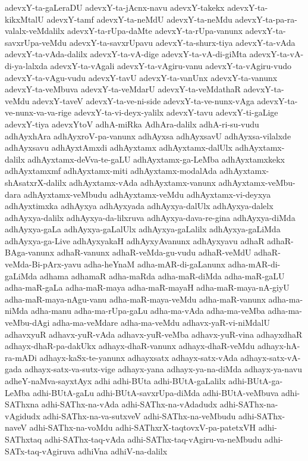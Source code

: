 {adevxY-ta-gaLeraDU
adevxY-ta-jAcnx-navu
adevxY-takekx
adevxY-ta-kikxMtalU
adevxY-tamf
adevxY-ta-neMdU
adevxY-ta-neMdu
adevxY-ta-pa-ra-valalx-veMdalilx
adevxY-ta-rUpa-daMte
adevxY-ta-rUpa-vanunx
adevxY-ta-savxrUpa-veMdu
adevxY-ta-savxrUpavu
adevxY-ta-shurx-tiya
adevxY-ta-vAda
adevxY-ta-vAda-dalilx
adevxY-ta-vA-dige
adevxY-ta-vA-di-giMta
adevxY-ta-vA-di-ya-lalxda
adevxY-ta-vAgali
adevxY-ta-vAgiru-vanu
adevxY-ta-vAgiru-vudo
adevxY-ta-vAgu-vudu
adevxY-tavU
adevxY-ta-vanUnx
adevxY-ta-vanunx
adevxY-ta-veMbuva
adevxY-ta-veMdarU
adevxY-ta-veMdathaR
adevxY-ta-veMdu
adevxY-taveV
adevxY-ta-ve-ni-side
adevxY-ta-ve-nunx-vAga
adevxY-ta-ve-nunx-va-va-rige
adevxY-ta-vi-deyx-yalilx
adevxY-tavu
adevxY-ti-gaLige
adevxY-tiya
adevxYtoV
adhA-miRka
AdhAra-dalilx
adhA-ri-su-vudu
adhAyxhAra
adhAyxroV-pa-vanunx
adhAyxsa
adhAyxsavU
adhAyxsa-vilalxde
adhAyxsavu
adhAyxtAmxdi
adhAyxtamx
adhAyxtamx-dalUlx
adhAyxtamx-dalilx
adhAyxtamx-deVva-te-gaLU
adhAyxtamx-ga-LeMba
adhAyxtamxkekx
adhAyxtamxmf
adhAyxtamx-miti
adhAyxtamx-modalAda
adhAyxtamx-shAsatxrX-dalilx
adhAyxtamx-vAda
adhAyxtamx-vanunx
adhAyxtamx-veMbu-dara
adhAyxtamx-veMbudu
adhAyxtamx-veMdu
adhAyxtamx-vi-deyxya
adhAyxtimxka
adhAyxya
adhAyxyada
adhAyxya-dalUlx
adhAyxya-dalelx
adhAyxya-dalilx
adhAyxya-da-lilxruva
adhAyxya-dava-re-gina
adhAyxya-diMda
adhAyxya-gaLa
adhAyxya-gaLalUlx
adhAyxya-gaLalilx
adhAyxya-gaLiMda
adhAyxya-ga-Live
adhAyxyakaH
adhAyxyAvanunx
adhAyxyavu
adhaR
adhaR-BAga-vanunx
adhaR-vanunx
adhaR-veMda-gu-vudu
adhaR-veMdU
adhaR-veMda-Bi-pArx-yavu
adha-heYnaM
adha-mAR-di-gaLanunx
adha-mAR-di-gaLiMda
adhama
adhamaR
adha-maRda
adha-maR-diMda
adha-maR-gaLU
adha-maR-gaLa
adha-maR-maya
adha-maR-mayaH
adha-maR-maya-nA-giyU
adha-maR-maya-nAgu-vanu
adha-maR-maya-veMdu
adha-maR-vanunx
adha-ma-niMda
adha-manu
adha-ma-rUpa-gaLu
adha-ma-vAda
adha-ma-veMba
adha-ma-veMbu-dAgi
adha-ma-veMdare
adha-ma-veMdu
adhavx-yaR-vi-niMdalU
adhavxyuR
adhavx-yuR-vAda
adhavx-yuR-veMba
adhavx-yuR-vina
adhayxdhaR
adhayx-dhaR-pa-dakUkx
adhayx-dhaR-vanunx
adhayx-dhaR-veMdu
adhayx-hA-ra-mADi
adhayx-kaSx-te-yanunx
adhayxsatx
adhayx-satx-vAda
adhayx-satx-vA-gada
adhayx-satx-va-sutx-vige
adhayx-yana
adhayx-ya-na-diMda
adhayx-ya-navu
adheY-naMva-sayxtAyx
adhi
adhi-BUta
adhi-BUtA-gaLalilx
adhi-BUtA-ga-LeMba
adhi-BUtA-gaLu
adhi-BUtA-savxrUpa-diMda
adhi-BUtA-veMbuva
adhi-SAThxna
adhi-SAThx-na-vAda
adhi-SAThx-na-vAdadudx
adhi-SAThx-na-vAgidudx
adhi-SAThx-na-va-sutxveV
adhi-SAThx-na-veMbudu
adhi-SAThx-naveV
adhi-SAThx-na-voMdu
adhi-SAThxrX-taqtovxV-pa-patetxVH
adhi-SAThxtaq
adhi-SAThx-taq-vAda
adhi-SAThx-taq-vAgiru-va-neMbudu
adhi-SATx-taq-vAgiruva
adhiVna
adhiV-na-dalilx
}
